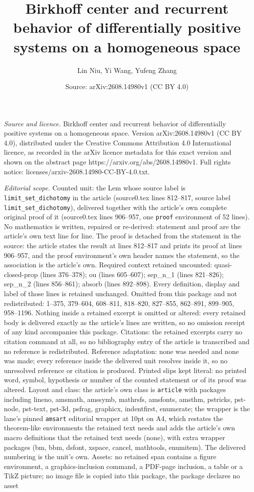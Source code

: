 \documentclass[10pt,a4paper]{amsart}
\title[Birkhoff center and recurrent behavior of differentially pos]{Birkhoff center and recurrent behavior of differentially positive systems on a homogeneous space}
\author{Lin Niu, Yi Wang, Yufeng Zhang}
\date{Source: arXiv:2608.14980v1 (CC BY 4.0)}
\begin{document}
\maketitle

\noindent\emph{Source and licence.} Birkhoff center and recurrent behavior of differentially positive systems on a homogeneous space. Version arXiv:2608.14980v1 (CC BY 4.0), distributed under the Creative Commons Attribution 4.0 International licence, as recorded in the arXiv licence metadata for this exact version and shown on the abstract page https://arxiv.org/abs/2608.14980v1. Full rights notice: licenses/arxiv-2608.14980-CC-BY-4.0.txt.\par\smallskip

\noindent\textit{Editorial scope.} Counted unit: the Lem whose source label is \texttt{limit\_set\_dichotomy} in the article (source0.tex lines 812--817, source label \texttt{limit\_set\_dichotomy}), delivered together with the article's own complete original proof of it (source0.tex lines 906--957, one \texttt{proof} environment of 52 lines). No mathematics is written, repaired or re-derived: statement and proof are the article's own text line for line. The proof is detached from the statement in the source: the article states the result at lines 812--817 and prints its proof at lines 906--957, and the proof environment's own header names the statement, so the association is the article's own. Required context retained uncounted: quasi-closed-prop (lines 376--378); ou (lines 605--607); sep\_n\_1 (lines 821--826); sep\_n\_2 (lines 856--861); absorb (lines 892--898). Every definition, display and label of those lines is retained unchanged. Omitted from this package and not redistributed: 1--375, 379--604, 608--811, 818--820, 827--855, 862--891, 899--905, 958--1196. Nothing inside a retained excerpt is omitted or altered: every retained body is delivered exactly as the article's lines are written, so no omission receipt of any kind accompanies this package. Citations: the retained excerpts carry no citation command at all, so no bibliography entry of the article is transcribed and no reference is redistributed. Reference adaptation: none was needed and none was made; every reference inside the delivered unit resolves inside it, so no unresolved reference or citation is produced. Printed slips kept literal: no printed word, symbol, hypothesis or number of the counted statement or of its proof was altered. Layout and class: the article's own class is \texttt{article} with packages including lineno, amsmath, amssymb, mathrsfs, amsfonts, amsthm, pstricks, pst-node, pst-text, pst-3d, psfrag, graphicx, indentfirst, enumerate; the wrapper is the lane's pinned \texttt{amsart} editorial wrapper at 10pt on A4, which restates the theorem-like environments the retained text needs and adds the article's own macro definitions that the retained text needs (none), with extra wrapper packages (bm, bbm, dsfont, xspace, cancel, mathtools, enumitem). The delivered numbering is the unit's own. Assets: no retained span contains a figure environment, a graphics-inclusion command, a PDF-page inclusion, a table or a TikZ picture; no image file is copied into this package, the package declares no asset 
\end{document}
